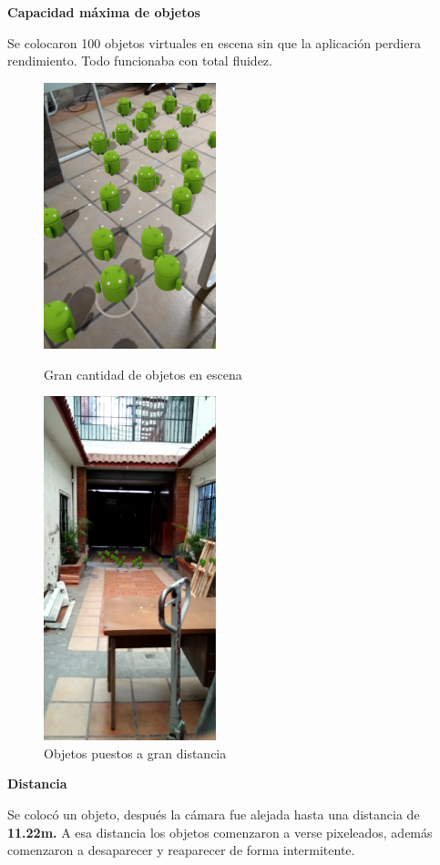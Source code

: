 \textbf{Capacidad máxima de objetos} \par
Se colocaron 100 objetos virtuales en escena sin que la aplicación perdiera rendimiento. Todo funcionaba con total fluidez.

\begin{figure}[!htbp]
	\begin{minipage}{0.48\textwidth}
		\centering
		\includegraphics[width=5cm]{desarrollo/secciones/pruebas/motog6/img/CANTIDAD.png}
		\caption{Gran cantidad de objetos en escena}
		\label{fig:motog6escena}
	\end{minipage}\hfill
	\begin{minipage}{0.48\textwidth}
		
		\centering
		\includegraphics[width=5cm]{desarrollo/secciones/pruebas/motog6/img/DISTANCIA.png}
		\caption{Objetos puestos a gran distancia}
		\label{fig:motog6edistancia}
	\end{minipage}\hfill
\end{figure}

\textbf{Distancia} \par
Se colocó un objeto, después la cámara fue alejada hasta una distancia de \textbf{11.22m.} A esa distancia los objetos comenzaron a verse pixeleados, además comenzaron a desaparecer y reaparecer de forma intermitente.

